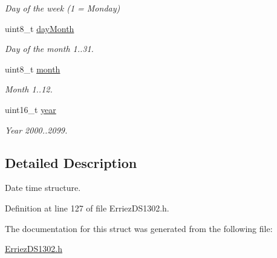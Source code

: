 \begin{DoxyCompactItemize}
\begin{DoxyCompactList}\small\item\em Day of the week (1 = Monday) \end{DoxyCompactList}\item 
uint8\+\_\+t \hyperlink{struct_d_s1302___date_time_acfb491b31c993fb66c166d29f7e4dbbd}{day\+Month}\hypertarget{struct_d_s1302___date_time_acfb491b31c993fb66c166d29f7e4dbbd}{}\label{struct_d_s1302___date_time_acfb491b31c993fb66c166d29f7e4dbbd}

\begin{DoxyCompactList}\small\item\em Day of the month 1..31. \end{DoxyCompactList}\item 
uint8\+\_\+t \hyperlink{struct_d_s1302___date_time_aad6c5e2ba633617eba36089873bec336}{month}\hypertarget{struct_d_s1302___date_time_aad6c5e2ba633617eba36089873bec336}{}\label{struct_d_s1302___date_time_aad6c5e2ba633617eba36089873bec336}

\begin{DoxyCompactList}\small\item\em Month 1..12. \end{DoxyCompactList}\item 
uint16\+\_\+t \hyperlink{struct_d_s1302___date_time_a58f8e7ec27826bb3b6cf86ea8acb1c5e}{year}\hypertarget{struct_d_s1302___date_time_a58f8e7ec27826bb3b6cf86ea8acb1c5e}{}\label{struct_d_s1302___date_time_a58f8e7ec27826bb3b6cf86ea8acb1c5e}

\begin{DoxyCompactList}\small\item\em Year 2000..2099. \end{DoxyCompactList}\end{DoxyCompactItemize}


\subsection{Detailed Description}
Date time structure. 

Definition at line 127 of file Erriez\+D\+S1302.\+h.



The documentation for this struct was generated from the following file\+:\begin{DoxyCompactItemize}
\item 
\hyperlink{_erriez_d_s1302_8h}{Erriez\+D\+S1302.\+h}\end{DoxyCompactItemize}
